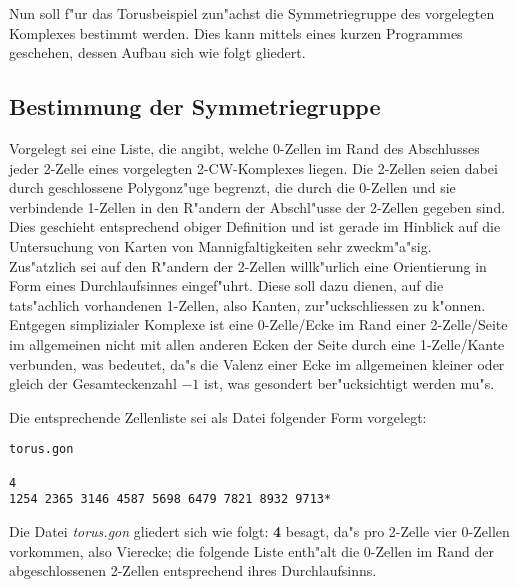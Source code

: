 Nun soll f"ur das Torusbeispiel zun"achst die Symmetriegruppe des vorgelegten
Komplexes bestimmt werden. Dies kann mittels eines kurzen Programmes geschehen,
dessen Aufbau sich wie folgt gliedert.

\subsection{Bestimmung der Symmetriegruppe}

Vorgelegt sei eine Liste, die angibt, welche 0-Zellen im Rand des Abschlusses
jeder 2-Zelle eines vorgelegten 2-CW-Komplexes liegen. Die 2-Zellen seien dabei
durch geschlossene Polygonz"uge begrenzt, die durch die 0-Zellen und sie
verbindende 1-Zellen in den R"andern der Abschl"usse der 2-Zellen gegeben
sind. Dies geschieht entsprechend obiger Definition und ist gerade im Hinblick
auf die Untersuchung von Karten von Mannigfaltigkeiten sehr zweckm"a"sig.\\
Zus"atzlich sei auf den R"andern der 2-Zellen willk"urlich eine Orientierung in
Form eines Durchlaufsinnes eingef"uhrt. Diese soll dazu dienen, auf die
tats"achlich vorhandenen 1-Zellen, also Kanten, zur"uckschliessen zu k"onnen.
{\scsi
Entgegen simplizialer Komplexe ist eine 0-Zelle/Ecke im Rand einer 2-Zelle/Seite
im allgemeinen nicht mit allen anderen Ecken der Seite durch eine 1-Zelle/Kante
verbunden, was bedeutet, da"s die Valenz einer Ecke im allgemeinen kleiner oder
gleich der Gesamt\-eckenzahl $-1$ ist, was gesondert ber"ucksichtigt werden
mu"s.
}

Die entsprechende Zellenliste sei als Datei folgender Form vorgelegt:
\begin{verbatim}
torus.gon

4
1254 2365 3146 4587 5698 6479 7821 8932 9713*
\end{verbatim}
{\scsi
Die Datei {\it torus.gon} gliedert sich wie folgt: {\bf 4} besagt, da"s pro
2-Zelle vier 0-Zellen vorkommen, also Vierecke; die folgende Liste enth"alt die
0-Zellen im Rand der abgeschlossenen 2-Zellen entsprechend ihres Durchlaufsinns.
}

